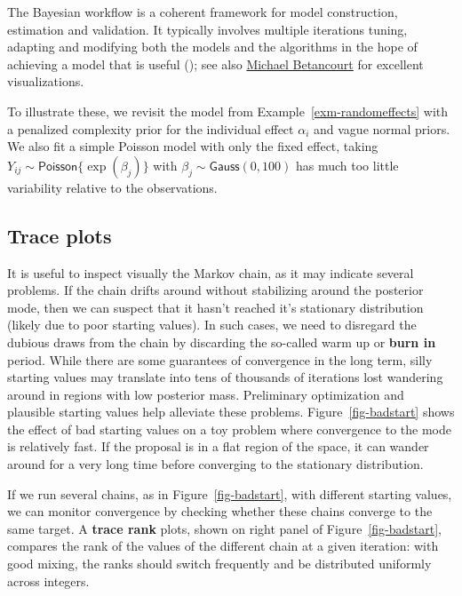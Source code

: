 \documentclass[
  11pt,
  letterpaper,
]{scrbook}
\theoremstyle{definition}
\theoremstyle{plain}
\theoremstyle{plain}
\theoremstyle{definition}
\theoremstyle{definition}
\theoremstyle{remark}
\begin{document}
The Bayesian workflow is a coherent framework for model construction,
estimation and validation. It typically involves multiple iterations
tuning, adapting and modifying both the models and the algorithms in the
hope of achieving a model that is useful
(); see also
\href{https://betanalpha.github.io/assets/case_studies/principled_bayesian_workflow.html}{Michael
Betancourt} for excellent visualizations.

To illustrate these, we revisit the model from
Example~\ref{exm-randomeffects} with a penalized complexity prior for
the individual effect \(\alpha_i\) and vague normal priors. We also fit
a simple Poisson model with only the fixed effect, taking
\(Y_{ij} \sim \mathsf{Poisson}\{\exp(\beta_j)\}\) with
\(\beta_j \sim \mathsf{Gauss}(0,100)\) has much too little variability
relative to the observations.

\subsection{Trace plots}\label{trace-plots}

It is useful to inspect visually the Markov chain, as it may indicate
several problems. If the chain drifts around without stabilizing around
the posterior mode, then we can suspect that it hasn't reached it's
stationary distribution (likely due to poor starting values). In such
cases, we need to disregard the dubious draws from the chain by
discarding the so-called warm up or \textbf{burn in} period. While there
are some guarantees of convergence in the long term, silly starting
values may translate into tens of thousands of iterations lost wandering
around in regions with low posterior mass. Preliminary optimization and
plausible starting values help alleviate these problems.
Figure~\ref{fig-badstart} shows the effect of bad starting values on a
toy problem where convergence to the mode is relatively fast. If the
proposal is in a flat region of the space, it can wander around for a
very long time before converging to the stationary distribution.

If we run several chains, as in Figure~\ref{fig-badstart}, with
different starting values, we can monitor convergence by checking
whether these chains converge to the same target. A \textbf{trace rank}
plots, shown on right panel of Figure~\ref{fig-badstart}, compares the
rank of the values of the different chain at a given iteration: with
good mixing, the ranks should switch frequently and be distributed
uniformly across integers.
\end{document}

